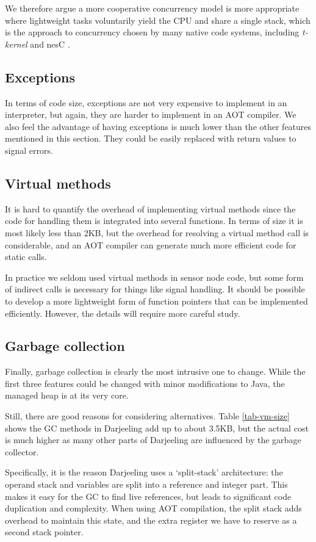 We therefore argue a more cooperative concurrency model is more appropriate where lightweight tasks voluntarily yield the CPU and share a single stack, which is the approach to concurrency chosen by many native code systems, including \emph{t-kernel} and nesC \cite{Gu:2005un, Gay:2003up, Hester:2016je}.

\subsection{Exceptions}
In terms of code size, exceptions are not very expensive to implement in an interpreter, but again, they are harder to implement in an AOT compiler. We also feel the advantage of having exceptions is much lower than the other features mentioned in this section. They could be easily replaced with return values to signal errors.


\subsection{Virtual methods}
It is hard to quantify the overhead of implementing virtual methods since the code for handling them is integrated into several functions. In terms of size it is most likely less than 2KB, but the overhead for resolving a virtual method call is considerable, and an AOT compiler can generate much more efficient code for static calls.

In practice we seldom used virtual methods in sensor node code, but some form of indirect calls is necessary for things like signal handling. It should be possible to develop a more lightweight form of function pointers that can be implemented efficiently. However, the details will require more careful study.


\subsection{Garbage collection}
Finally, garbage collection is clearly the most intrusive one to change. While the first three features could be changed with minor modifications to Java, the managed heap is at its very core.

Still, there are good reasons for considering alternatives. Table \ref{tab-vm-size} shows the GC methods in Darjeeling add up to about 3.5KB, but the actual cost is much higher as many other parts of Darjeeling are influenced by the garbage collector.

Specifically, it is the reason Darjeeling uses a `split-stack' architecture: the operand stack and variables are split into a reference and integer part. This makes it easy for the GC to find live references, but leads to significant code duplication and complexity. When using AOT compilation, the split stack adds overhead to maintain this state, and the extra register we have to reserve as a second stack pointer.




